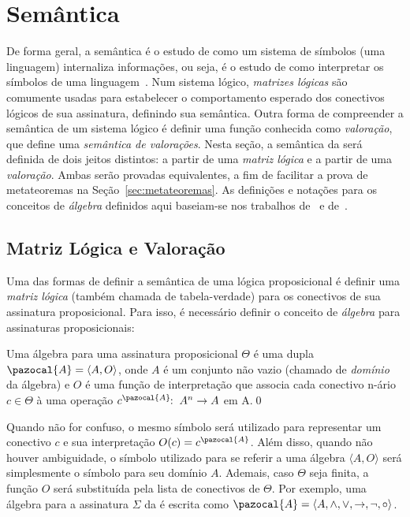 \section{Semântica}
\label{sec:semantica}
    De forma geral, a semântica é o estudo de como um sistema de símbolos (uma linguagem) internaliza informações, ou seja, é o estudo de como interpretar os símbolos de uma linguagem~\cite{brown2005encyclopedia}. Num sistema lógico, \textit{matrizes lógicas} são comumente usadas para estabelecer o comportamento esperado dos conectivos lógicos de sua assinatura, definindo sua semântica. Outra forma de compreender a semântica de um sistema lógico é definir uma função conhecida como \textit{valoração}, que define uma \textit{semântica de valorações}. Nesta seção, a semântica da \lfium{} será definida de dois jeitos distintos: a partir de uma \textit{matriz lógica} e a partir de uma \textit{valoração}. Ambas serão provadas equivalentes, a fim de facilitar a prova de metateoremas na Seção~\ref{sec:metateoremas}. As definições e notações para os conceitos de \textit{álgebra} definidos aqui baseiam-se nos trabalhos de~ e de~.
    \subsection{Matriz Lógica e Valoração}
        Uma das formas de definir a semântica de uma lógica proposicional é definir uma \textit{matriz lógica} (também chamada de tabela-verdade) para os conectivos de sua assinatura proposicional. Para isso, é necessário definir o conceito de \textit{álgebra} para assinaturas proposicionais:
         

        \begin{definicao}
        \label{def:algebra}
            Uma álgebra para uma assinatura proposicional $\Theta$ é uma dupla $\pazocal{A} = \langle A, O \rangle$, onde $A$ é um conjunto não vazio (chamado de \textit{domínio} da álgebra) e $O$ é uma função de interpretação que associa cada conectivo n-ário $c \in \Theta$ à uma operação $c^{\pazocal{A}}\!\! : \; A^{n} \rightarrow A$ em A.\qed{}
        \end{definicao}

        Quando não for confuso, o mesmo símbolo será utilizado para representar um conectivo $c$ e sua interpretação $O(c) = c^{\pazocal{A}}$. Além disso, quando não houver ambiguidade, o símbolo utilizado para se referir a uma álgebra $\langle A, O \rangle$ será simplesmente o símbolo para seu domínio $A$. Ademais, caso $\Theta$ seja finita, a função $O$ será substituída pela lista de conectivos de $\Theta$. Por exemplo, uma álgebra para a assinatura $\Sigma$ da \lfium{} é escrita como $\pazocal{A} = \langle A,\land, \lor, \rightarrow, \neg, \circ \rangle$.

